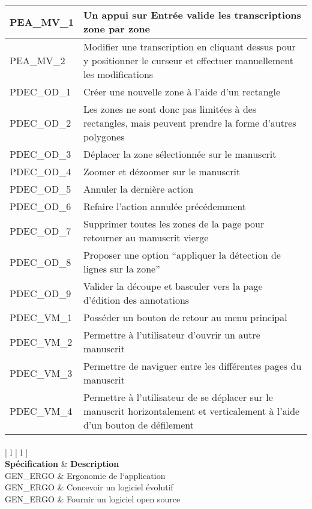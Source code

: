 \begin{center}
\begin{tabular}{ | l | l | }
	\hline
	PEA\_MV\_1 & Un appui sur Entrée valide les transcriptions zone par zone \\
	\hline
	PEA\_MV\_2 & Modifier une transcription en cliquant dessus pour y positionner le curseur et effectuer manuellement les modifications  \\
	\hline
	PDEC\_OD\_1 & Créer une nouvelle zone à l’aide d’un rectangle \\
	\hline
	PDEC\_OD\_2 & Les zones ne sont donc pas limitées à des rectangles, mais peuvent prendre la forme d’autres polygones \\
	\hline
	PDEC\_OD\_3 & Déplacer la zone sélectionnée sur le manuscrit \\
	\hline
	PDEC\_OD\_4 & Zoomer et dézoomer sur le manuscrit  \\
	\hline
	PDEC\_OD\_5 & Annuler la dernière action \\
	\hline
	PDEC\_OD\_6 & Refaire l’action annulée précédemment \\
	\hline
	PDEC\_OD\_7 & Supprimer toutes les zones de la page pour retourner au manuscrit vierge \\
	\hline
	PDEC\_OD\_8 & Proposer une option “appliquer la détection de lignes sur la zone” \\
	\hline
	PDEC\_OD\_9 & Valider la découpe et basculer vers la page d’édition des annotations  \\
	\hline
	PDEC\_VM\_1 & Posséder un bouton de retour au menu principal \\
	\hline
	PDEC\_VM\_2 & Permettre à l’utilisateur d’ouvrir un autre manuscrit \\
	\hline
	PDEC\_VM\_3 & Permettre de naviguer entre les différentes pages du manuscrit \\
	\hline
	PDEC\_VM\_4 & Permettre à l’utilisateur de se déplacer sur le manuscrit horizontalement et verticalement à l’aide d’un bouton de défilement \\
	\hline
\end{tabular}

\paragraph{}
\begin{tabular}{ | l | l | }
	\hline
	 \\
	\hline
	\textbf{Spécification} & \textbf{Description} \\
	\hline
	GEN\_ERGO & Ergonomie de l‘application \\
	\hline
	GEN\_ERGO & Concevoir un logiciel évolutif \\
	\hline
	GEN\_ERGO & Fournir un logiciel open source \\
	\hline
\end{tabular}

\end{center}

